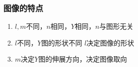 \subsubsection{图像的特点}

\begin{enumerate}
    \item $l,m$不同，$n$相同，$Y$相同，$n$与图形无关
    \item $l$不同，$Y$图的形状不同 $l$决定图像的形状
    \item $m$决定$Y$图的伸展方向，决定图像取向
\end{enumerate}